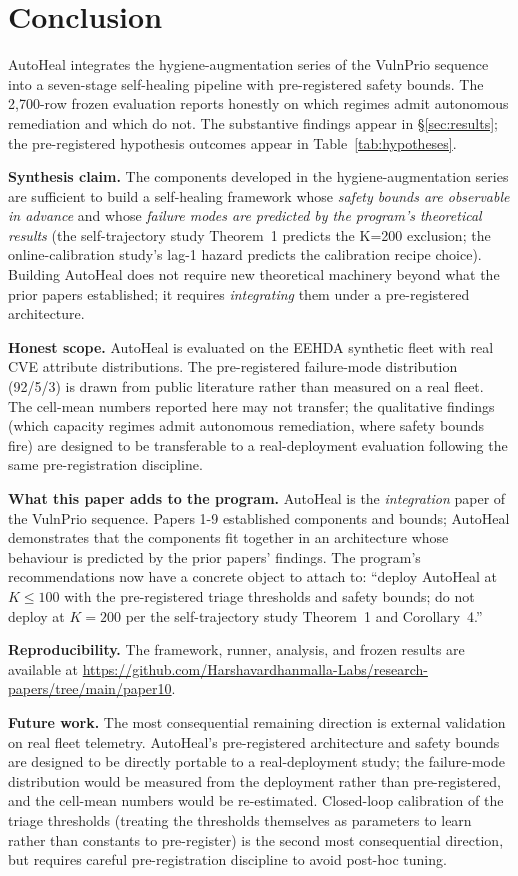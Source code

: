 \section{Conclusion}
\label{sec:conclusion}

AutoHeal integrates the hygiene-augmentation series of the VulnPrio sequence into a
seven-stage self-healing pipeline with pre-registered safety bounds.
The 2{,}700-row frozen evaluation reports honestly on which regimes
admit autonomous remediation and which do not. The substantive
findings appear in \S\ref{sec:results}; the pre-registered
hypothesis outcomes appear in Table~\ref{tab:hypotheses}.

\textbf{Synthesis claim.} The components developed in
the hygiene-augmentation series are sufficient to build a self-healing framework whose
\emph{safety bounds are observable in advance} and whose
\emph{failure modes are predicted by the program's theoretical
results} (the self-trajectory study Theorem~1 predicts the K=200 exclusion;
the online-calibration study's lag-1 hazard predicts the calibration recipe choice).
Building AutoHeal does not require new theoretical machinery beyond
what the prior papers established; it requires \emph{integrating}
them under a pre-registered architecture.

\textbf{Honest scope.} AutoHeal is evaluated on the EEHDA synthetic
fleet with real CVE attribute distributions. The pre-registered
failure-mode distribution (92/5/3) is drawn from public literature
rather than measured on a real fleet. The cell-mean numbers reported
here may not transfer; the qualitative findings (which capacity
regimes admit autonomous remediation, where safety bounds fire) are
designed to be transferable to a real-deployment evaluation
following the same pre-registration discipline.

\textbf{What this paper adds to the program.} AutoHeal is the
\emph{integration} paper of the VulnPrio sequence. Papers 1-9
established components and bounds; AutoHeal demonstrates that the
components fit together in an architecture whose behaviour is
predicted by the prior papers' findings. The program's
recommendations now have a concrete object to attach to: ``deploy
AutoHeal at $K \leq 100$ with the pre-registered triage thresholds
and safety bounds; do not deploy at $K = 200$ per the self-trajectory study
Theorem~1 and Corollary~4.''

\textbf{Reproducibility.} The framework, runner, analysis, and
frozen results are available at
\url{https://github.com/Harshavardhanmalla-Labs/research-papers/tree/main/paper10}.

\textbf{Future work.} The most consequential remaining direction is
external validation on real fleet telemetry. AutoHeal's
pre-registered architecture and safety bounds are designed to be
directly portable to a real-deployment study; the failure-mode
distribution would be measured from the deployment rather than
pre-registered, and the cell-mean numbers would be re-estimated.
Closed-loop calibration of the triage thresholds (treating the
thresholds themselves as parameters to learn rather than constants
to pre-register) is the second most consequential direction, but
requires careful pre-registration discipline to avoid
post-hoc tuning.
